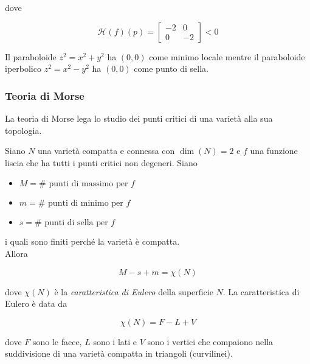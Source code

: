dove

\begin{equation}
	\mathcal{H}(f)(p) = \begin{bmatrix} -2 & 0 \\ 0 & -2 \end{bmatrix} < 0
\end{equation}

Il paraboloide $ z^{2} = x^{2} + y^{2} $ ha $ (0,0) $ come minimo locale mentre il paraboloide iperbolico $ z^{2} = x^{2} - y^{2} $ ha $ (0,0) $ come punto di sella.

\subsubsection{Teoria di Morse}

La teoria di Morse lega lo studio dei punti critici di una varietà alla sua topologia.

\begin{theorem}
	Siano $ N $ una varietà compatta e connessa con $ \dim(N)=2 $ e $ f $ una funzione liscia che ha tutti i punti critici non degeneri. Siano
	
	\begin{itemize}
		\item $ M = \# \text{ punti di massimo per } f $
		
		\item $ m = \# \text{ punti di minimo per } f $
		
		\item $ s = \# \text{ punti di sella per } f $
	\end{itemize}

	i quali sono finiti perché la varietà è compatta.\\
	Allora
	
	\begin{equation}
		M - s + m = \chi(N)
	\end{equation}

	dove $ \chi(N) $ è la \textit{caratteristica di Eulero} della superficie $ N $. La caratteristica di Eulero è data da
	
	\begin{equation}
		\chi(N) = F - L + V
	\end{equation}

	dove $ F $ sono le facce, $ L $ sono i lati e $ V $ sono i vertici che compaiono nella suddivisione di una varietà compatta in triangoli (curvilinei).
\end{theorem}

